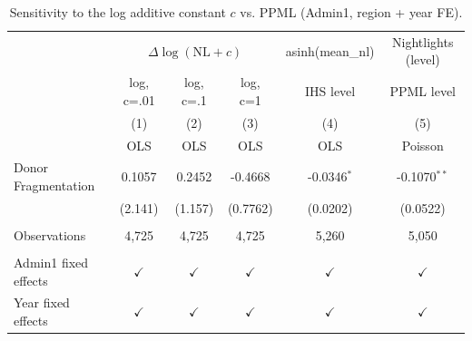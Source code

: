 
\begin{table}[htbp]
   \caption{\label{tab:annual_csens} Sensitivity to the log additive constant $c$ vs. PPML (Admin1, region + year FE).}
   \bigskip
   \centering
   \begin{tabular}{lccccc}
      \toprule
       & \multicolumn{3}{c}{$\Delta\log(\mathrm{NL}+c)$} & asinh(mean\_nl) & Nightlights (level)\\
                           & log, c=.01    & log, c=.1     & log, c=1      & IHS level     & PPML level \\   
                           & (1)           & (2)           & (3)           & (4)           & (5)\\  
                           &  OLS          & OLS           & OLS           & OLS           & Poisson\\  
      \midrule 
      Donor Fragmentation  & 0.1057        & 0.2452        & -0.4668       & -0.0346$^{*}$ & -0.1070$^{**}$\\   
                           & (2.141)       & (1.157)       & (0.7762)      & (0.0202)      & (0.0522)\\   
       \\
      Observations         & 4,725         & 4,725         & 4,725         & 5,260         & 5,050\\  
       \\
      Admin1 fixed effects & $\checkmark$  & $\checkmark$  & $\checkmark$  & $\checkmark$  & $\checkmark$\\   
      Year fixed effects   & $\checkmark$  & $\checkmark$  & $\checkmark$  & $\checkmark$  & $\checkmark$\\   
      \bottomrule
   \end{tabular}
\end{table}


